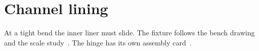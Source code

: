 \documentclass{article}
\begin{document}
\section*{Channel lining}
At a tight bend the inner liner must slide.
The fixture follows the bench drawing~\cite{bench} and the scale study~\cite{scale}. The hinge has its own assembly card~\cite{flap}.
\nocite{atlas,guide,lining}

\end{document}

